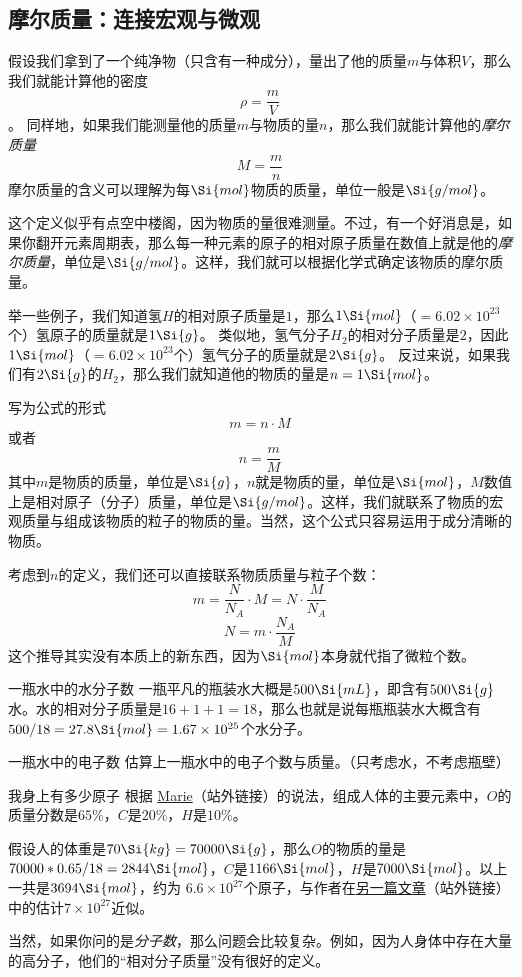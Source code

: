 \subsection{摩尔质量：连接宏观与微观}
假设我们拿到了一个纯净物（只含有一种成分），量出了他的质量$m$与体积$V$，那么我们就能计算他的密度
$$\rho = \frac{m}{V}$$。
同样地，如果我们能测量他的质量$m$与物质的量$n$，那么我们就能计算他的\textsl{摩尔质量}
$$M = \frac{m}{n}$$
摩尔质量的含义可以理解为每$\Si{mol}$物质的质量，单位一般是$\Si{g/mol}$。

这个定义似乎有点空中楼阁，因为物质的量很难测量。不过，有一个好消息是，如果你翻开元素周期表，那么每一种元素的原子的相对原子质量在数值上就是他的\textsl{摩尔质量}，单位是$\Si{g/mol}$。这样，我们就可以根据化学式确定该物质的摩尔质量。

举一些例子，我们知道氢$H$的相对原子质量是$1$，那么$1 \Si{mol}$（$=6.02\times 10^{23}$个）氢原子的质量就是$1 \Si{g}$。
类似地，氢气分子$H_2$的相对分子质量是$2$，因此$1 \Si{mol}$（$=6.02\times 10^{23}$个）氢气分子的质量就是$2 \Si{g}$。
反过来说，如果我们有$2 \Si{g}$的$H_2$，那么我们就知道他的物质的量是$n=1 \Si{mol}$。

写为公式的形式
$$m = n \cdot M$$
或者
$$n = \frac{m}{M}$$
其中$m$是物质的质量，单位是$\Si{g}$，$n$就是物质的量，单位是$\Si{mol}$，$M$数值上是相对原子（分子）质量，单位是$\Si{g/mol}$。这样，我们就联系了物质的宏观质量与组成该物质的粒子的物质的量。当然，这个公式只容易运用于成分清晰的物质。

考虑到$n$的定义，我们还可以直接联系物质质量与粒子个数：
$$m = \frac{N}{N_A} \cdot M = N \cdot \frac{M}{N_A}$$
$$N = m \cdot \frac{N_A}{M}$$
这个推导其实没有本质上的新东西，因为$\Si{mol}$本身就代指了微粒个数。

\begin{example}{一瓶水中的水分子数}
一瓶平凡的瓶装水大概是$500 \Si{mL}$，即含有$500 \Si{g}$水。水的相对分子质量是$16+1+1=18$，那么也就是说每瓶瓶装水大概含有$500/18=27.8 \Si{mol} = 1.67 \times 10^{25}$个水分子。
\end{example}

\begin{exercise}{一瓶水中的电子数}
估算上一瓶水中的电子个数与质量。（只考虑水，不考虑瓶壁）
\end{exercise}

\begin{example}{我身上有多少原子}
根据 \href{https://www.thoughtco.com/elemental-composition-of-human-body-603896}{Marie}（站外链接）的说法，组成人体的主要元素中，$O$的质量分数是$65\%$，$C$是$20\%$，$H$是$10\%$。

假设人的体重是$70 \Si{kg} = 70 000\Si{g}$，那么$O$的物质的量是$70000*0.65/18 = 2844 \Si{mol}$，$C$是$ 1166 \Si{mol}$，$H$是$ 7000 \Si{mol}$。以上一共是$3694 \Si{mol}$，约为 $6.6\times10^{27}$个原子，与作者在\href{https://www.thoughtco.com/how-many-atoms-are-in-human-body-603872}{另一篇文章}（站外链接）中的估计$7\times10^{27}$近似。

当然，如果你问的是\textsl{分子数}，那么问题会比较复杂。例如，因为人身体中存在大量的高分子，他们的“相对分子质量”没有很好的定义。
\end{example}

